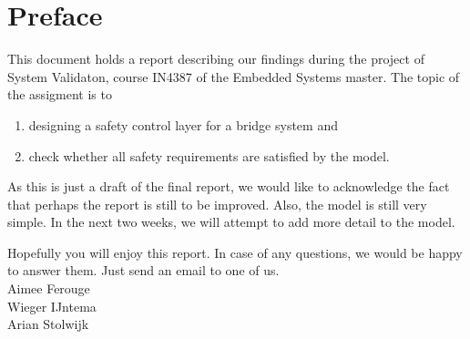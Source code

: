 \newpage
\section*{Preface}

This document holds a report describing our findings during the project of System Validaton, course IN4387 of the Embedded Systems master.
The topic of the assigment is to
%
\begin{enumerate}
	\item designing a safety control layer for a bridge system and
	\item check whether all safety requirements are satisfied by the model.
\end{enumerate}
%
As this is just a draft of the final report, we would like to acknowledge the fact that perhaps the report is still to be improved. Also, the model is still very simple. In the next two weeks, we will attempt to add more detail to the model.

Hopefully you will enjoy this report. In case of any questions, we would be happy to answer them. Just send an email to one of us.\\
\vspace{+50pt}
Aimee Ferouge\\
Wieger IJntema\\
Arian Stolwijk


\newpage